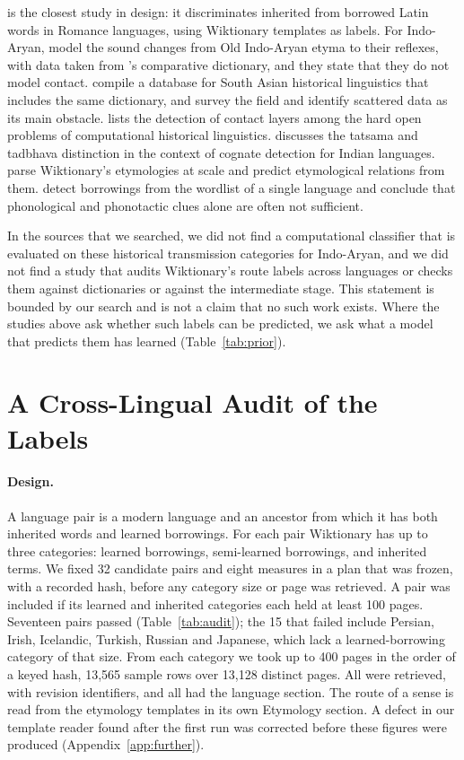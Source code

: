 \documentclass[11pt]{article}
\begin{document}
\citet{cristea2021inherited} is the closest study in design: it discriminates inherited from borrowed Latin words in Romance languages, using Wiktionary templates as labels. For Indo-Aryan, \citet{cathcart2020disentangling} model the sound changes from Old Indo-Aryan etyma to their reflexes, with data taken from \citeauthor{turner1966cdial}'s comparative dictionary, and they state that they do not model contact. \citet{arora2023jambu} compile a database for South Asian historical linguistics that includes the same dictionary, and \citet{arora2022computational} survey the field and identify scattered data as its main obstacle. \citet{list2024openproblems} lists the detection of contact layers among the hard open problems of computational historical linguistics. \citet[\S4.1]{kanojia2021thesis} discusses the tatsama and tadbhava distinction in the context of cognate detection for Indian languages. \citet{wu2020computational} parse Wiktionary's etymologies at scale and predict etymological relations from them. \citet{miller2020lexical} detect borrowings from the wordlist of a single language and conclude that phonological and phonotactic clues alone are often not sufficient.

In the sources that we searched, we did not find a computational classifier that is evaluated on these historical transmission categories for Indo-Aryan, and we did not find a study that audits Wiktionary's route labels across languages or checks them against dictionaries or against the intermediate stage. This statement is bounded by our search and is not a claim that no such work exists. Where the studies above ask whether such labels can be predicted, we ask what a model that predicts them has learned (Table~\ref{tab:prior}).

\section{A Cross-Lingual Audit of the Labels}
\label{sec:audit}

\paragraph{Design.} A language pair is a modern language and an ancestor from which it has both inherited words and learned borrowings. For each pair Wiktionary has up to three categories: learned borrowings, semi-learned borrowings, and inherited terms. We fixed 32 candidate pairs and eight measures in a plan that was frozen, with a recorded hash, before any category size or page was retrieved. A pair was included if its learned and inherited categories each held at least 100 pages. Seventeen pairs passed (Table~\ref{tab:audit}); the 15 that failed include Persian, Irish, Icelandic, Turkish, Russian and Japanese, which lack a learned-borrowing category of that size. From each category we took up to 400 pages in the order of a keyed hash, 13,565 sample rows over 13,128 distinct pages. All were retrieved, with revision identifiers, and all had the language section. The route of a sense is read from the etymology templates in its own Etymology section. A defect in our template reader found after the first run was corrected before these figures were produced (Appendix~\ref{app:further}).
\end{document}
